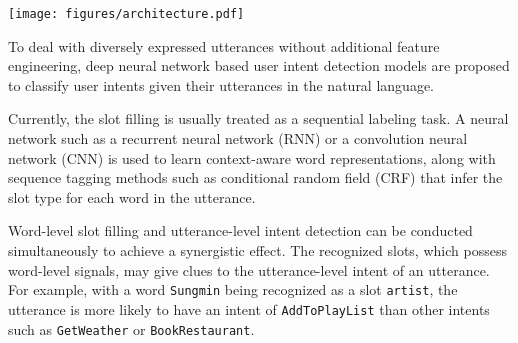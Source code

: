 \documentclass[11pt,a4paper,hyphens]{article}
\newcommand{\ModelName}{{\textsc{Capsule-NLU}}}
\newcommand{\FirstCapsule}{WordCaps}
\newcommand{\SecondCapsule}{SlotCaps}
\begin{document}
\begin{figure*}[htbp]
    \centering
    \texttt{[image: figures/architecture.pdf]}
    \vspace{0.05in}
    \caption{Illustration of the proposed {\ModelName} model for joint slot filling and intent detection. The model does slot filling by learning to assign each word in the {\FirstCapsule} to the most appropriate slot in {\SecondCapsule} via dynamic routing. The weights learned via dynamic routing indicate how strong each word in {\FirstCapsule} belongs to a certain slot type in {\SecondCapsule}. The dynamic routing also learns slot representations using {\FirstCapsule} and the learned weight. The learned slot representations in {\SecondCapsule} are further aggregated to predict the utterance-level intent of the utterance. Once the intent label of the utterance is determined, a novel re-routing process is proposed to help improve word-level slot filling by the inferred utterance-level intent label. The solid lines indicate the dynamic-routing process and dash lines indicate the re-routing process. 
    }
    \label{fig::overall}
\end{figure*}

To deal with diversely expressed utterances without additional feature engineering, deep neural network based user intent detection models \citep{hu2009understanding,xu2013convolutional,zhang2016mining,liu2016attention,zhang2017bringing,chen2016end,xia2018zero} are proposed to classify user intents given their utterances in the natural language. 

Currently, the slot filling is usually treated as a sequential labeling task. A neural network such as a recurrent neural network (RNN) or a convolution neural network (CNN) is used to learn context-aware word representations, along with sequence tagging methods such as conditional random field (CRF) \citep{lafferty2001conditional} that infer the slot type for each word in the utterance.

Word-level slot filling and utterance-level intent detection can be conducted simultaneously to achieve a synergistic effect.
The recognized slots, which possess word-level signals, may give clues to the utterance-level intent of an utterance. For example, with a word \texttt{Sungmin} being recognized as a slot \texttt{artist}, the utterance is more likely to have an intent of \texttt{AddToPlayList} than other intents such as \texttt{GetWeather} or \texttt{BookRestaurant}. 
\end{document}
